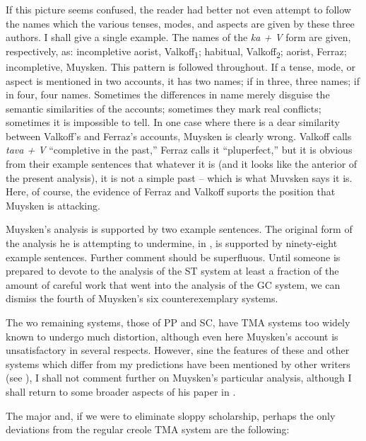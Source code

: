 If this picture seems confused, the reader had better not even attempt to follow the names which the various tenses, modes, and aspects are given by these three authors. I shall give a single example. The names of the \textit{ka + V} form are given, respectively, as: incompletive aorist, Valkoff\textsubscript{1}; habitual, Valkoff\textsubscript{2}; aorist, Ferraz; incompletive, Muysken. This pattern is followed throughout. If a tense, mode, or aspect is mentioned in two accounts, it has two names; if in three, three names; if in four, four names. Sometimes the differences in name merely disguise the semantic similarities of the accounts; sometimes they mark real conflicts; sometimes it is impossible to tell. In one case where there is a dear similarity between Valkoff's and Ferraz's accounts, Muysken is clearly wrong. Valkoff calls \textit{tava + V} ``completive
in the past,'' Ferraz calls it ``pluperfect,'' but it is obvious from their example sentences that whatever it is (and it looks like the anterior of the present analysis), it is not a simple past -- which is what Muvsken says it is. Here, of course, the evidence of Ferraz and Valkoff suports the position that Muysken is attacking.

Muysken's analysis is supported by two example sentences. The original form of the analysis he is attempting to undermine, in \citet[Chapter~2]{Bickerton1975}, is supported by ninety-eight example sentences. Further comment should be superfluous. Until someone is prepared to devote to the analysis of the ST system at least a fraction of the amount of careful work that went into the analysis of the GC system, we can dismiss the fourth of Muysken's six counterexemplary systems.

The wo remaining systems, those of PP and SC, have TMA sys\-tems too widely known to undergo much distortion, although even here Muysken's account is unsatisfactory in several respects. However, sine the features of these and other systems which differ from my predictions have been mentioned by other writers (see \citealt{Hill1979}), I shall not comment further on Muysken's particular analysis, although I shall return to some broader aspects of his paper in .

The major and, if we were to eliminate sloppy scholarship, perhaps the only deviations from the regular creole TMA system are the following:

